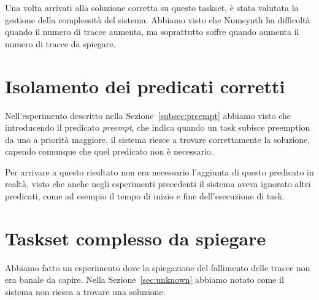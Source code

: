 Una volta arrivati alla soluzione corretta su questo taskset, è stata valutata la gestione della complessità del sistema. Abbiamo visto che Numsynth ha difficoltà quando il numero di tracce aumenta, ma soprattutto soffre quando aumenta il numero di tracce da spiegare.

\section{Isolamento dei predicati corretti}
Nell'esperimento descritto nella Sezione~\ref{subsec:preempt} abbiamo visto che introducendo il predicato \textit{preempt}, che indica quando un task subisce preemption da uno a priorità maggiore, il sistema riesce a trovare correttamente la soluzione, capendo comunque che quel predicato non è necessario.

Per arrivare a questo risultato non era necessario l'aggiunta di questo predicato in realtà, visto che anche negli esperimenti precedenti il sistema aveva ignorato altri predicati, come ad esempio il tempo di inizio e fine dell'esecuzione di task.

\section{Taskset complesso da spiegare}
Abbiamo fatto un esperimento dove la spiegazione del fallimento delle tracce non era banale da capire. Nella Sezione~\ref{sec:unknown} abbiamo notato come il sistema non riesca a trovare una soluzione.